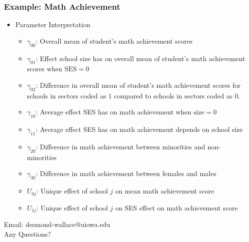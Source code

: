 \documentclass{beamer}
\begin{document}
\begin{frame}
	\frametitle{Example: Math Achievement}
		\begin{itemize}
			\item Parameter Interpretation
				\begin{itemize}
					\item $\gamma_{00}$: Overall mean of student's math achievement scores
					\item $\gamma_{01}$: Effect school size has on overall mean of student's math achievement scores when $\mbox{SES}=0$
					\item $\gamma_{02}$: Difference in overall mean of student's math achievement scores for schools in sectors coded as $1$ compared to schools in sectors coded as $0$.
					\item $\gamma_{10}$: Average effect SES has on math achievement when $\mbox{size}=0$
					\item $\gamma_{11}$: Average effect SES has on math achievement depends on school size
					\item $\gamma_{20}$: Difference in math achievement between minorities and non-minorities
					\item $\gamma_{30}$: Difference in math achievement between females and males
					\item $U_{0j}$: Unique effect of school $j$ on mean math achievement score
					\item $U_{1j}$: Unique effect of school $j$ on SES effect on math achievement score
				\end{itemize}
		\end{itemize}
\end{frame}

\begin{frame}
	\begin{center}
		\begin{LARGE}
			Email: desmond-wallace@uiowa.edu\\
			Any Questions?
		\end{LARGE}
	\end{center}
\end{frame}
\end{document}
